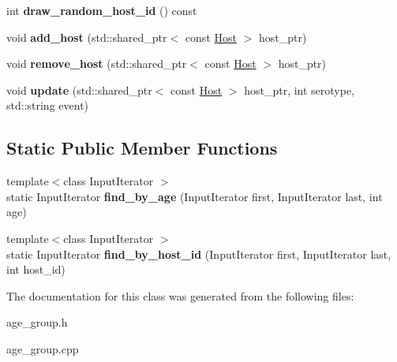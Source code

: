 \begin{DoxyCompactItemize}
\mbox{\label{class_age_group_a15d25df3c9824bcc8a7f985801badd97}} 
int {\bfseries draw\+\_\+random\+\_\+host\+\_\+id} () const
\item 
\mbox{\label{class_age_group_a84a137cefc721b6aab94e1c07dc752d6}} 
void {\bfseries add\+\_\+host} (std\+::shared\+\_\+ptr$<$ const \hyperlink{class_host}{Host} $>$ host\+\_\+ptr)
\item 
\mbox{\label{class_age_group_a82c4bf166bbf0809a34111292bc31bdb}} 
void {\bfseries remove\+\_\+host} (std\+::shared\+\_\+ptr$<$ const \hyperlink{class_host}{Host} $>$ host\+\_\+ptr)
\item 
\mbox{\label{class_age_group_aff4d379276ddce16962cb864327d77d4}} 
void {\bfseries update} (std\+::shared\+\_\+ptr$<$ const \hyperlink{class_host}{Host} $>$ host\+\_\+ptr, int serotype, std\+::string event)
\end{DoxyCompactItemize}
\subsection*{Static Public Member Functions}
\begin{DoxyCompactItemize}
\item 
\mbox{\label{class_age_group_a8c3dac4ad810d06595dae16a8a26c1e4}} 
{\footnotesize template$<$class Input\+Iterator $>$ }\\static Input\+Iterator {\bfseries find\+\_\+by\+\_\+age} (Input\+Iterator first, Input\+Iterator last, int age)
\item 
\mbox{\label{class_age_group_a2901bfaad8b6444b16ac35c684c3c2b3}} 
{\footnotesize template$<$class Input\+Iterator $>$ }\\static Input\+Iterator {\bfseries find\+\_\+by\+\_\+host\+\_\+id} (Input\+Iterator first, Input\+Iterator last, int host\+\_\+id)
\end{DoxyCompactItemize}


The documentation for this class was generated from the following files\+:\begin{DoxyCompactItemize}
\item 
age\+\_\+group.\+h\item 
age\+\_\+group.\+cpp\end{DoxyCompactItemize}

